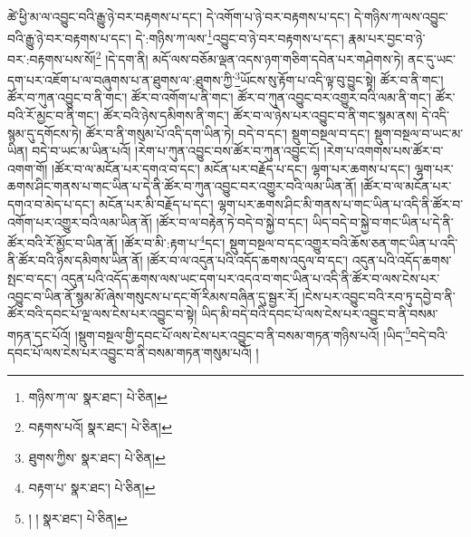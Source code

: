 ཚེ་ཕྱི་མ་ལ་འབྱུང་བའི་རྒྱུ་ཉེ་བར་བརྟགས་པ་དང་། དེ་འགོག་པ་ཉེ་བར་བརྟགས་པ་དང་། དེ་གཉིས་ཀ་ལས་འབྱུང་བའི་རྒྱུ་ཉེ་བར་བརྟགས་པ་དང་། དེ་:གཉིས་ཀ་ལས་\footnote{གཉིས་ཀ་ལ་  སྣར་ཐང་།  པེ་ཅིན། }འབྱུང་བ་ཉེ་བར་བརྟགས་པ་དང་། རྣམ་པར་བྱང་བ་ཉེ་བར་:བརྟགས་པས་སོ།\footnote{བརྟགས་པའོ།  སྣར་ཐང་།  པེ་ཅིན། } །དེ་དག་ནི། མདོ་ལས་བཅོམ་ལྡན་འདས་ཉག་གཅིག་དབེན་པར་གཤེགས་ཏེ། ནང་དུ་ཡང་དག་པར་འཇོག་པ་ལ་བཞུགས་པ་ན་ཐུགས་ལ་:ཐུགས་ཀྱི་\footnote{ཐུགས་ཀྱིས་  སྣར་ཐང་།  པེ་ཅིན། }ཡོངས་སུ་རྟོག་པ་འདི་ལྟ་བུ་བྱུང་སྟེ། ཚོར་བ་ནི་གང་། ཚོར་བ་ཀུན་འབྱུང་བ་ནི་གང་། ཚོར་བ་འགོག་པ་ནི་གང་། ཚོར་བ་ཀུན་འབྱུང་བར་འགྱུར་བའི་ལམ་ནི་གང་། ཚོར་བའི་རོ་མྱང་བ་ནི་གང་། ཚོར་བའི་ཉེས་དམིགས་ནི་གང་། ཚོར་བ་ལ་ཉེས་པར་འབྱུང་བ་ནི་གང་སྙམ་ནས། དེ་འདི་སྙམ་དུ་དགོངས་ཏེ། ཚོར་བ་ནི་གསུམ་པོ་འདི་དག་ཡིན་ཏེ། བདེ་བ་དང་། སྡུག་བསྔལ་བ་དང་། སྡུག་བསྔལ་བ་ཡང་མ་ཡིན། བདེ་བ་ཡང་མ་ཡིན་པའོ། །རེག་པ་ཀུན་འབྱུང་བས་ཚོར་བ་ཀུན་འབྱུང་ངོ། །རེག་པ་འགགས་པས་ཚོར་བ་འགག་གོ། །ཚོར་བ་ལ་མངོན་པར་དགའ་བ་དང་། མངོན་པར་བརྗོད་པ་དང་། ལྷག་པར་ཆགས་པ་དང་། ལྷག་པར་ཆགས་ཤིང་གནས་པ་གང་ཡིན་པ་དེ་ནི་ཚོར་བ་ཀུན་འབྱུང་བར་འགྱུར་བའི་ལམ་ཡིན་ནོ། །ཚོར་བ་ལ་མངོན་པར་དགའ་བ་མེད་པ་དང་། མངོན་པར་མི་བརྗོད་པ་དང་། ལྷག་པར་ཆགས་ཤིང་མི་གནས་པ་གང་ཡིན་པ་འདི་ནི་ཚོར་བ་འགོག་པར་འགྱུར་བའི་ལམ་ཡིན་ནོ། །ཚོར་བ་ལ་བརྟེན་ཏེ་བདེ་བ་སྐྱེ་བ་དང་། ཡིད་བདེ་བ་སྐྱེ་བ་གང་ཡིན་པ་དེ་ནི་ཚོར་བའི་རོ་མྱོང་བ་ཡིན་ནོ། །ཚོར་བ་མི་:རྟག་པ་\footnote{བརྟག་པ་  སྣར་ཐང་།  པེ་ཅིན། }དང་། སྡུག་བསྔལ་བ་དང་འགྱུར་བའི་ཆོས་ཅན་གང་ཡིན་པ་འདི་ནི་ཚོར་བའི་ཉེས་དམིགས་ཡིན་ནོ། །ཚོར་བ་ལ་འདུན་པའི་འདོད་ཆགས་འདུལ་བ་དང་། འདུན་པའི་འདོད་ཆགས་སྤང་བ་དང་། འདུན་པའི་འདོད་ཆགས་ལས་ཡང་དག་པར་འདའ་བ་གང་ཡིན་པ་འདི་ནི་ཚོར་བ་ལས་ངེས་པར་འབྱུང་བ་ཡིན་ནོ་སྙམ་མོ་ཞེས་གསུངས་པ་དང་གོ་རིམས་བཞིན་དུ་སྦྱར་རོ། །ངེས་པར་འབྱུང་བའི་རབ་ཏུ་དབྱེ་བ་ནི་ཚོར་བའི་དབང་པོ་ལྔ་ལས་ངེས་པར་འབྱུང་བ་སྟེ། ཡིད་མི་བདེ་བའི་དབང་པོ་ལས་ངེས་པར་འབྱུང་བ་ནི་བསམ་གཏན་དང་པོའོ། །སྡུག་བསྔལ་གྱི་དབང་པོ་ལས་ངེས་པར་འབྱུང་བ་ནི་བསམ་གཏན་གཉིས་པའོ། །ཡིད་\footnote{། །  སྣར་ཐང་།  པེ་ཅིན། }བདེ་བའི་དབང་པོ་ལས་ངེས་པར་འབྱུང་བ་ནི་བསམ་གཏན་གསུམ་པའོ། །
